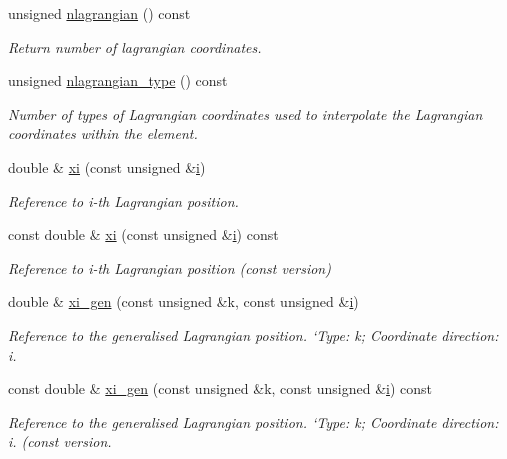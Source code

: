 \begin{DoxyCompactItemize}
unsigned \hyperlink{classoomph_1_1SolidNode_af98a0623f9e41a10f48112b9ff7b38a0}{nlagrangian} () const
\begin{DoxyCompactList}\small\item\em Return number of lagrangian coordinates. \end{DoxyCompactList}\item 
unsigned \hyperlink{classoomph_1_1SolidNode_a3c1e52e4b6dde53b98228d621f7fcb0a}{nlagrangian\+\_\+type} () const
\begin{DoxyCompactList}\small\item\em Number of types of Lagrangian coordinates used to interpolate the Lagrangian coordinates within the element. \end{DoxyCompactList}\item 
double \& \hyperlink{classoomph_1_1SolidNode_aca98d62374067829ef896bdf62952385}{xi} (const unsigned \&\hyperlink{cfortran_8h_adb50e893b86b3e55e751a42eab3cba82}{i})
\begin{DoxyCompactList}\small\item\em Reference to i-\/th Lagrangian position. \end{DoxyCompactList}\item 
const double \& \hyperlink{classoomph_1_1SolidNode_a0f302ab875874e1474d86ce54ac49cb0}{xi} (const unsigned \&\hyperlink{cfortran_8h_adb50e893b86b3e55e751a42eab3cba82}{i}) const
\begin{DoxyCompactList}\small\item\em Reference to i-\/th Lagrangian position (const version) \end{DoxyCompactList}\item 
double \& \hyperlink{classoomph_1_1SolidNode_a409f7536f7d47c7900be8d0fa06c17cd}{xi\+\_\+gen} (const unsigned \&k, const unsigned \&\hyperlink{cfortran_8h_adb50e893b86b3e55e751a42eab3cba82}{i})
\begin{DoxyCompactList}\small\item\em Reference to the generalised Lagrangian position. `\+Type\textquotesingle{}\+: k; \textquotesingle{}Coordinate direction\+: i. \end{DoxyCompactList}\item 
const double \& \hyperlink{classoomph_1_1SolidNode_a3a02b5a1d7fcf3b78d93f0e727289a6f}{xi\+\_\+gen} (const unsigned \&k, const unsigned \&\hyperlink{cfortran_8h_adb50e893b86b3e55e751a42eab3cba82}{i}) const
\begin{DoxyCompactList}\small\item\em Reference to the generalised Lagrangian position. `\+Type\textquotesingle{}\+: k; \textquotesingle{}Coordinate direction\+: i. (const version. \end{DoxyCompactList}\item 

\end{DoxyCompactItemize}
